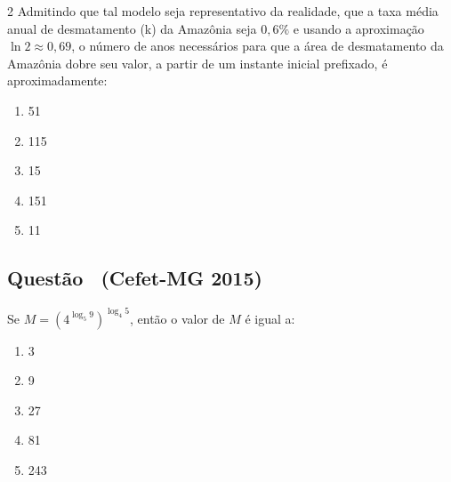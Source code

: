 \documentclass[12pt]{article}
\newcommand{\vermelho}[1]{{\color{red}#1}}
\newcounter{questao}
\newcommand{\novaquestao}[1]{%
  \stepcounter{questao}%
  \subsection*{Questão \thequestao\ (#1)}%
}
\begin{document}
\begin{multicols}{2}
         Admitindo que tal modelo seja representativo da realidade, que a taxa média anual de desmatamento (k) da Amazônia seja $0,6\%$ e usando a aproximação $\ln2 \approx 0,69$, o número de anos necessários para que a área de desmatamento da Amazônia dobre seu valor, a partir de um instante inicial prefixado, é aproximadamente:
         
         \begin{enumerate}[label=(\Alph*), noitemsep]
         	\item 51
         	\item \vermelho{115} %
         	\item 15
         	\item 151
         	\item 11
         \end{enumerate}
         
         \novaquestao{Cefet-MG 2015} Se $M=\left( 4^{\log_{5}9} \right)^{\log_{4}5}$, então o valor de $M$ é igual a:
         
         \begin{enumerate}[label=(\Alph*), noitemsep]
         	\item 3
         	\item \vermelho{9} %
         	\item 27
         	\item 81
         	\item 243
         \end{enumerate}
         	
         
         
         
         
         
         	
         	
         	
         	
         	
         	
    \end{multicols}
    
\end{document}
